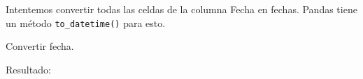 Intentemos convertir todas las celdas de la columna
\textquotesingle Fecha\textquotesingle{} en fechas. Pandas tiene un
método \texttt{to\_datetime()} para esto.\\

\begin{code} Convertir fecha.

\begin{Shaded}
\begin{Highlighting}[]

\OperatorTok{=}\NormalTok{)}

\NormalTok{df[}\NormalTok{] }\OperatorTok{=}\NormalTok{ pd.to\_datetime(df[}\NormalTok{])}

\end{Highlighting}
\end{Shaded}

\begin{Shaded}
\begin{Highlighting}[]

\end{Highlighting}
\end{Shaded}

Resultado:


\end{code}
